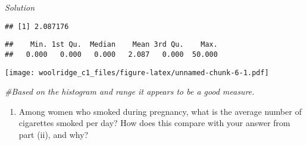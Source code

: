 \documentclass[
]{article}
\newenvironment{Shaded}{\begin{snugshade}}{\end{snugshade}}
\newcommand{\CommentTok}[1]{\textcolor[rgb]{0.56,0.35,0.01}{\textit{#1}}}
\newcommand{\KeywordTok}[1]{\textcolor[rgb]{0.13,0.29,0.53}{\textbf{#1}}}
\newcommand{\NormalTok}[1]{#1}
\newcommand{\OperatorTok}[1]{\textcolor[rgb]{0.81,0.36,0.00}{\textbf{#1}}}
\providecommand{\tightlist}{%
  \setlength{\itemsep}{0pt}\setlength{\parskip}{0pt}}
\begin{document}
\emph{Solution}

\begin{Shaded}
\end{Shaded}

\begin{verbatim}
## [1] 2.087176
\end{verbatim}

\begin{Shaded}
\end{Shaded}

\begin{verbatim}
##    Min. 1st Qu.  Median    Mean 3rd Qu.    Max. 
##   0.000   0.000   0.000   2.087   0.000  50.000
\end{verbatim}

\begin{Shaded}
\end{Shaded}

\texttt{[image: woolridge\_c1\_files/figure-latex/unnamed-chunk-6-1.pdf]}

\begin{Shaded}
\begin{Highlighting}[]
\CommentTok{#Based on the histogram and range it appears to be a good measure.}
\end{Highlighting}
\end{Shaded}

\begin{enumerate}
\def\labelenumi{(\roman{enumi})}
\setcounter{enumi}{2}
\tightlist
\item
  Among women who smoked during pregnancy, what is the average number of
  cigarettes smoked per day? How does this compare with your answer from
  part (ii), and why?
\end{enumerate}

\begin{Shaded}
\end{Shaded}
\end{document}

